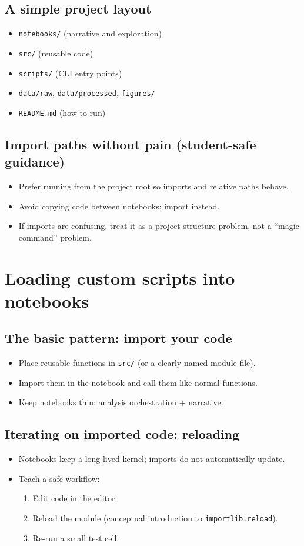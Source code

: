 \subsection{A simple project layout}
\begin{itemize}
\item \texttt{notebooks/} (narrative and exploration)
\item \texttt{src/} (reusable code)
\item \texttt{scripts/} (CLI entry points)
\item \texttt{data/raw}, \texttt{data/processed}, \texttt{figures/}
\item \texttt{README.md} (how to run)
\end{itemize}

\subsection{Import paths without pain (student-safe guidance)}
\begin{itemize}
\item Prefer running from the project root so imports and relative paths behave.
\item Avoid copying code between notebooks; import instead.
\item If imports are confusing, treat it as a project-structure problem, not a ``magic command'' problem.
\end{itemize}

\section{Loading custom scripts into notebooks}
\subsection{The basic pattern: import your code}
\begin{itemize}
\item Place reusable functions in \texttt{src/} (or a clearly named module file).
\item Import them in the notebook and call them like normal functions.
\item Keep notebooks thin: analysis orchestration + narrative.
\end{itemize}

\subsection{Iterating on imported code: reloading}
\begin{itemize}
\item Notebooks keep a long-lived kernel; imports do not automatically update.
\item Teach a safe workflow:
\begin{enumerate}
\item Edit code in the editor.
\item Reload the module (conceptual introduction to \texttt{importlib.reload}).
\item Re-run a small test cell.
\end{enumerate}
\end{itemize}

